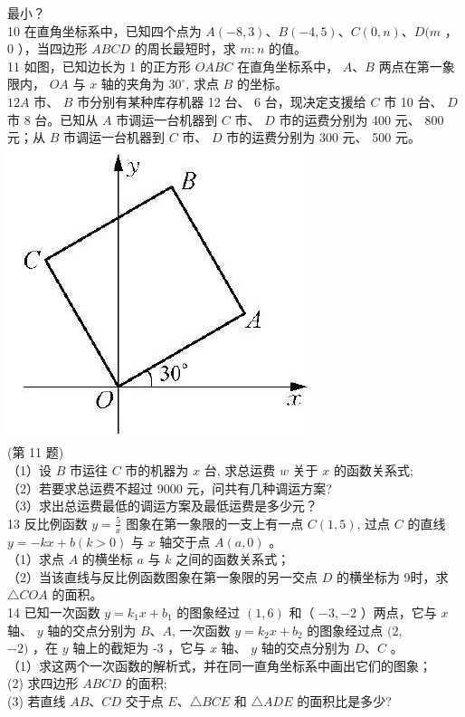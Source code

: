 \documentclass[10pt]{article}
\begin{document}
最小？\\
10 在直角坐标系中，已知四个点为 $A(-8,3) 、 B(-4,5) 、 C(0, n) 、 D(m$ ， 0 ），当四边形 $A B C D$ 的周长最短时，求 $m: n$ 的值。\\
11 如图，已知边长为 1 的正方形 $O A B C$ 在直角坐标系中， $A 、 B$ 两点在第一象限内， $O A$ 与 $x$ 轴的夹角为 $30^{\circ}$, 求点 $B$ 的坐标。\\
$12 A$ 市、 $B$ 市分别有某种库存机器 12 台、 6 台，现决定支援给 $C$ 市 10 台、 $D$ 市 8 台。已知从 $A$ 市调运一台机器到 $C$ 市、 $D$ 市的运费分别为 400 元、 800元；从 $B$ 市调运一台机器到 $C$ 市、 $D$ 市的运费分别为 300 元、 500 元。\\
\includegraphics[max width=\textwidth, center]{2024_10_30_1bf34f7aeb61f11d11d3g-023(1)}\\
(第 11 题)\\
（1）设 $B$ 市运往 $C$ 市的机器为 $x$ 台, 求总运费 $w$ 关于 $x$ 的函数关系式;\\
（2）若要求总运费不超过 9000 元，问共有几种调运方案?\\
（3）求出总运费最低的调运方案及最低运费是多少元？\\
13 反比例函数 $y=\frac{5}{x}$ 图象在第一象限的一支上有一点 $C(1,5)$, 过点 $C$ 的直线 $y=-k x+b(k>0)$ 与 $x$ 轴交于点 $A(a, 0)$ 。\\
（1）求点 $A$ 的横坐标 $a$ 与 $k$ 之间的函数关系式；\\
（2）当该直线与反比例函数图象在第一象限的另一交点 $D$ 的横坐标为 9时，求 $\triangle C O A$ 的面积。\\
14 已知一次函数 $y=k_{1} x+b_{1}$ 的图象经过 $(1,6)$ 和（ $-3,-2$ ）两点，它与 $x$轴、 $y$ 轴的交点分别为 $B 、 A$, 一次函数 $y=k_{2} x+b_{2}$ 的图象经过点 $(2$,\\
$-2)$ ，在 $y$ 轴上的截矩为 -3 ，它与 $x$ 轴、 $y$ 轴的交点分别为 $D 、 C$ 。\\
（1）求这两个一次函数的解析式，并在同一直角坐标系中画出它们的图象；\\
(2) 求四边形 $A B C D$ 的面积;\\
(3) 若直线 $A B 、 C D$ 交于点 $E 、 \triangle B C E$ 和 $\triangle A D E$ 的面积比是多少?
\end{document}
